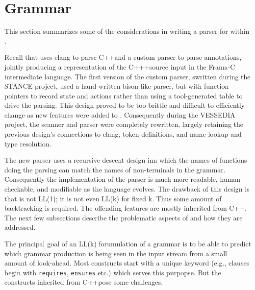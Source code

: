 \newcommand{\lang}{C++}
\section{Grammar}
\label{sec:grammar}

This section summarizes some of the considerations in writing a parser for \acslpp within \fclang.

Recall that \fclang uses clang to parse \lang and a custom parser to parse \acslpp annotations, jointly producing a representation of the \lang+\acslpp source input in the Frama-C intermediate language. The first version of the \acslpp custom parser, swritten during the STANCE project, used a hand-written bison-like parser, but with function pointers to record state and actions rather than using a tool-generated table to drive the parsing. This design proved to be too brittle and difficult to efficiently change as new features were added to \acslpp. Consequently during the VESSEDIA project, the scanner and parser were completely rewritten, largely retaining the previous design's connections to clang, token definitions, and name lookup and type resolution.

The new parser uses a recursive descent design inn which the names of functions doing the parsing can match the names of non-terminals in the grammar. Consequently the implementation of the parser is much more readable, human checkable, and modifiable as the \acslpp language evolves. The drawback of this design is that \acslpp is not LL(1); it is not even LL(k) for fixed k. Thus some amount of backtracking is required. The offending features are mostly inherited from \lang. The next few subsections describe the problematic aspects of \acslpp and how they are addressed.

The principal goal of an LL(k) forumulation of a grammar is to be able to predict which grammar production is being seen in the input stream from a small amount of look-ahead.
Most \acslpp constructs start with a unique keyword (e.g., clauses begin with \lstinline|requires|, \lstinline|ensures| etc.) which serves this purpopse. But the constructs inherited from \lang pose some challenges.

